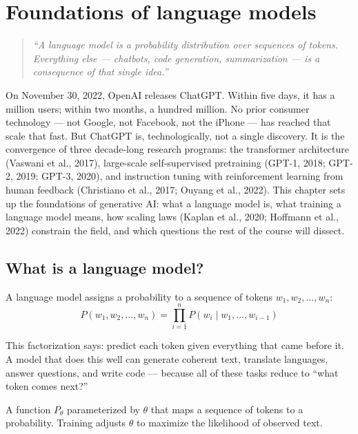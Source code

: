 \chapter{Foundations of language models}
\label{ch:foundations}

\begin{quote}
\emph{``A language model is a probability distribution over sequences of tokens. Everything else --- chatbots, code generation, summarization --- is a consequence of that single idea.''}
\end{quote}

On November 30, 2022, OpenAI releases ChatGPT. Within five days, it has a million users; within two months, a hundred million. No prior consumer technology --- not Google, not Facebook, not the iPhone --- has reached that scale that fast. But ChatGPT is, technologically, not a single discovery. It is the convergence of three decade-long research programs: the transformer architecture (Vaswani et al., 2017), large-scale self-supervised pretraining (GPT-1, 2018; GPT-2, 2019; GPT-3, 2020), and instruction tuning with reinforcement learning from human feedback (Christiano et al., 2017; Ouyang et al., 2022). This chapter sets up the foundations of generative AI: what a language model is, what training a language model means, how scaling laws (Kaplan et al., 2020; Hoffmann et al., 2022) constrain the field, and which questions the rest of the course will dissect.

\section{What is a language model?}

A language model assigns a probability to a sequence of tokens $w_1, w_2, \ldots, w_n$:
\[
P(w_1, w_2, \ldots, w_n) = \prod_{i=1}^{n} P(w_i \mid w_1, \ldots, w_{i-1})
\]

This factorization says: predict each token given everything that came before it. A model that does this well can generate coherent text, translate languages, answer questions, and write code --- because all of these tasks reduce to ``what token comes next?''

\begin{definition}
A function $P_\theta$ parameterized by $\theta$ that maps a sequence of tokens to a probability. Training adjusts $\theta$ to maximize the likelihood of observed text.
\end{definition}

